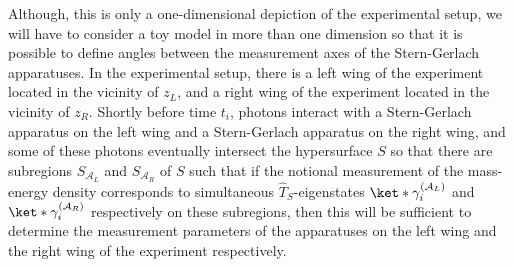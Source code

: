 \documentclass[12pt]{report}
\begin{document}
Although, this is only a one-dimensional depiction of the experimental setup, we will have to consider a toy model in more than one dimension so that it is possible to define angles between the measurement axes of the Stern-Gerlach apparatuses. In the experimental setup, there is a left wing of the experiment located in the vicinity of $z_L$, and a right wing of the experiment located in the vicinity of $z_R$. Shortly before time $t_i$, photons interact with a Stern-Gerlach apparatus on the left wing and a Stern-Gerlach apparatus on the right wing, and some of these photons eventually intersect the hypersurface $S$ so that there are subregions $S_{\mathcal{A}_L}$ and $S_{\mathcal{A}_R}$ %
%
 of $S$ such that if the notional measurement of the mass-energy density corresponds to simultaneous $\hat{T}_S$-eigenstates $\ket*{\gamma_i^{(\mathcal{A}_L)}}$ and $\ket*{\gamma_i^{(\mathcal{A}_R)}}$ %
  respectively on these subregions, then this will be sufficient to determine the measurement parameters of the apparatuses on the left wing and the right wing of the experiment respectively. 
\end{document}
